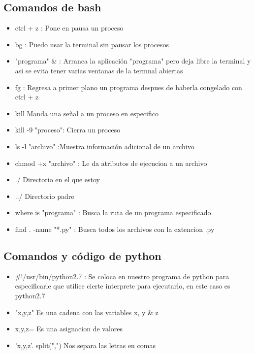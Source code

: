 \documentclass{book}
\begin{document}
	\subsection {Comandos de bash}%
	\begin{itemize}%
		\item ctrl + z : Pone en pausa un proceso
		\item bg : Puedo usar la terminal sin pausar los procesos
		\item "programa" \& : Arranca la aplicación "programa" pero deja libre la terminal y asi se evita tener varias ventanas de la termnal abiertas
		\item fg : Regresa a primer plano un programa despues de haberla congelado con ctrl + z
		\item kill Manda una señal a un proceso en especifico
		\item kill -9 "proceso": Cierra un proceso
		\item ls -l "archivo" :Muestra información adicional de un archivo
		\item chmod +x "archivo" : Le da atributos de ejecucion a un archivo
		\item ./ Directorio en el que estoy
		\item ../ Directorio padre
		\item where is "programa" : Busca la ruta de un programa especificado
		\item find . -name "*.py" : Busca todos los archivos con la extencion .py
		
		
	\end{itemize}%
	
	\subsection {Comandos y código de python}
	\begin{itemize}
		\item \#!/usr/bin/python2.7  : Se coloca en nuestro programa de python para especificarle que utilice cierte interprete para ejecutarlo, en este caso es python2.7
		\item "x,y,z" Es una cadena con las variables x, y \& z
		\item x,y,z= Es una asignacion de valores
		\item 'x,y,z'. split(",") Nos separa las letras en comas
	\end{itemize}
\end{document}
